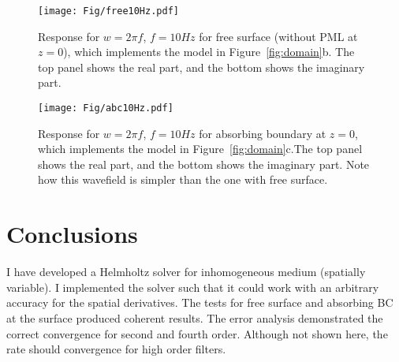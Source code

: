 \documentclass[10pt]{article}
\begin{document}
\begin{figure}
\texttt{[image: Fig/free10Hz.pdf]}
\caption{Response for $w=2\pi f$, $f=10Hz$ for free surface (without PML at $z=0$), which implements the model in Figure~\ref{fig:domain}b. The top panel
        shows the real part, and the bottom shows the imaginary part.}
\label{fig:free}
\end{figure}

\begin{figure}
\texttt{[image: Fig/abc10Hz.pdf]}
\caption{Response for $w=2\pi f$, $f=10Hz$ for absorbing boundary at $z=0$, which implements the model in Figure~\ref{fig:domain}c.The top panel
        shows the real part, and the bottom shows the imaginary part. Note how this wavefield is simpler than the one with free surface.}
\label{fig:free}
\end{figure}


\section{Conclusions}
I have developed a Helmholtz solver for inhomogeneous medium (spatially variable). I implemented
the solver such that it could work with an arbitrary accuracy for the spatial derivatives. The 
tests for free surface and absorbing BC at the surface produced coherent results.
The error analysis demonstrated the correct convergence for second and fourth order. Although
not shown here, the rate should convergence for high order filters.


 
\end{document}
